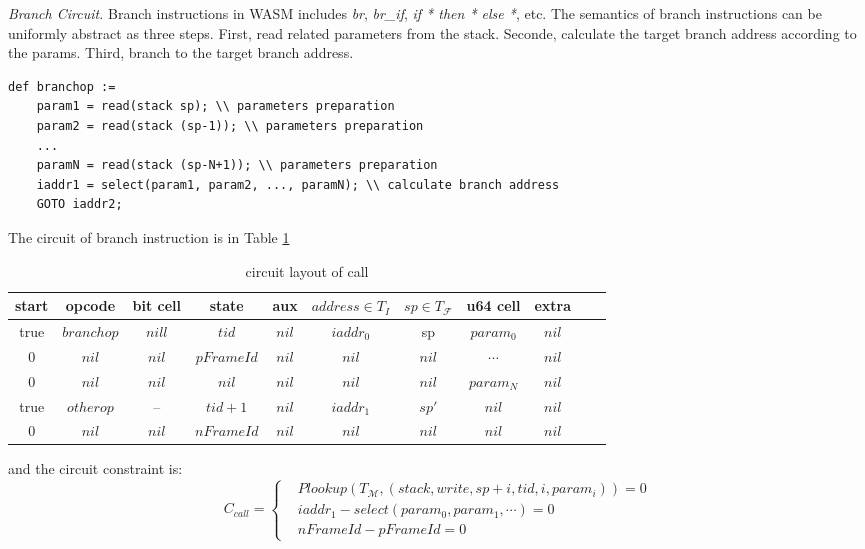 \smallskip\noindent\emph{Branch Circuit.}
Branch instructions in WASM includes \emph{br}, \emph{br\_if}, \emph{if * then * else *}, etc. The semantics of branch instructions can be uniformly abstract as three steps. First, read related parameters from the stack. Seconde, calculate the target branch address according to the params. Third, branch to the target branch address.
\begin{verbatim}
def branchop :=
    param1 = read(stack sp); \\ parameters preparation
    param2 = read(stack (sp-1)); \\ parameters preparation
    ...
    paramN = read(stack (sp-N+1)); \\ parameters preparation
    iaddr1 = select(param1, param2, ..., paramN); \\ calculate branch address
    GOTO iaddr2;
\end{verbatim}
The circuit of branch instruction is in Table \ref{tbl:branch-instruction}
\begin{table}[!h]
\begin{center}
\begin{tabular}{ | c | c | c | c | c | c | c | c | c | c | c | }
  \hline
  start & opcode & bit cell & state & aux & $address \in T_{I}$ & $sp \in T_\mathcal{F}$& u64 cell & extra \\ 
  \hline
   true & $branchop$ & $nill$ & $tid$ & $nil$ & $iaddr_0$ & sp & $param_0$ & $nil$\\ 
 \hline
   0 & $nil$ & $nil$ & $pFrameId$ & $nil$ & $nil$ & $nil$ & $\cdots$ & $nil$\\ 
 \hline
   0 & $nil$ & $nil$ & $nil$ & $nil$ & $nil$ & $nil$ & $param_N$ & $nil$\\ 
 \hline
   true & $otherop$ & -- & $tid + 1$ & $nil$ & $iaddr_1$ & $sp'$ & $nil$ & $nil$\\
 \hline
   0 & $nil$ & $nil$ & $nFrameId$ & $nil$ & $nil$ & $nil$ & $nil$ & $nil$\\ 
 \hline
\end{tabular}
\caption{circuit layout of call}
\label{tbl:branch-instruction}
\end{center}
\end{table}

\noindent and the circuit constraint is:
\[
    C_{call} = \begin{cases}
        &Plookup(T_\mathcal{M}, (stack, write, sp+i, tid, i, param_i)) = 0 \\
        &iaddr_1 - select(param_0, param_1, \cdots) = 0 \\
        &nFrameId - pFrameId = 0
    \end{cases}
\]

